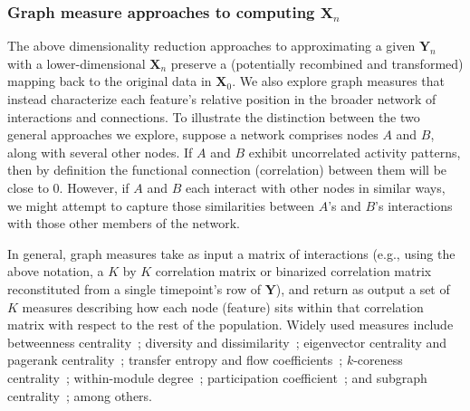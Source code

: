 \documentclass[english]{article}
\begin{document}
\subsubsection*{Graph measure approaches to computing
  $\mathbf{X}_n$}
The above dimensionality reduction approaches to approximating a given
$\mathbf{Y}_n$ with a lower-dimensional $\mathbf{X}_n$ preserve a
(potentially recombined and transformed) mapping back to the original
data in $\mathbf{X}_0$.  We also explore graph measures that instead
characterize each feature's relative position in the broader
network of interactions and connections.  To illustrate the
distinction between the two general approaches we explore, suppose a
network comprises nodes $A$ and $B$, along with several other nodes.  If $A$ and $B$ exhibit
uncorrelated activity patterns, then by definition the functional connection
(correlation) between them will be close to 0.
However, if $A$ and $B$ each interact with other nodes in similar ways, we
might attempt to capture those similarities between $A$'s and $B$'s
interactions with those other members of the network.

In general, graph measures take as input a matrix of
interactions (e.g., using the above notation, a $K$ by $K$
correlation matrix or binarized correlation matrix reconstituted from
a single timepoint's row of $\mathbf{Y}$), and return as output a set
of $K$ measures describing how each node (feature) sits within that
correlation matrix with respect to the rest of the population.  Widely
used measures include betweenness centrality~\citep[the proportion of
shortest paths between each pair of nodes in the population that
involves the given node in question; e.g.,][]{Newm05, OpsaEtal10,
  Bart04, GeisEtal08, Free77}; diversity and
dissimilarity~\citep[characterizations of how differently connected a
given node is from others in the population; e.g.,][]{Rao82, Lin09,
  RicoSzei06}; eigenvector centrality and pagerank
centrality~\citep[measures of how influential a given node is within
the broader network; e.g.,][]{Newm08, Bona07, LohmEtal10,
  HaluEtal13}; transfer entropy and flow coefficients~\citep[a measure
of how much information is flowing from a given node to other nodes in
the network; e.g.,][]{HoneEtal07, Schr00}; $k$-coreness
centrality~\citep[a measure of the connectivity of a node within its
local subgraph; e.g.,][]{AlvaEtal05, ChriFowl10}; within-module
degree~\citep[a measure of how many connections a node has to its
close neighbors in the network; e.g.,][]{RubiSpor10}; participation
coefficient~\citep[a measure of the diversity of a node's connections
to different subgraphs in the network; e.g.,][]{RubiSpor10}; and
subgraph centrality~\citep[a measure of a node's participation in all
of the network's subgraphs; e.g.,][]{EstrRodr05}; among others.
\end{document}
